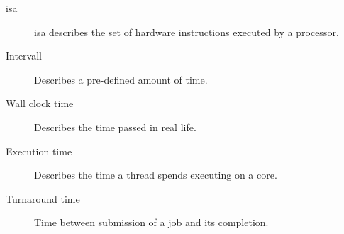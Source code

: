 \begin{description}
  \item[\Gls{isa}]\gls{isa} describes the set of hardware instructions executed
    by a processor.

  \item[Intervall] Describes a pre-defined amount of time.
  \item[Wall clock time] Describes the time passed in real life.
  \item[Execution time] Describes the time a thread spends executing on a
    core.


  \item[Turnaround time] Time between submission of a job and its completion.





\end{description}
